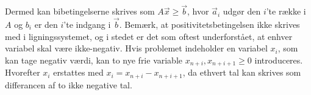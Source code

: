 
Dermed kan bibetingelserne skrives som $A\vec{x}\geq \vec{b}$, hvor $\vec{a}_i$ udgør den $i$'te række i $A$ og $b_i$ er den $i$'te indgang i $\vec{b}$.
Bemærk, at positivitetsbetingelsen ikke skrives med i ligningssystemet, og i stedet er det som oftest underforstået, at enhver variabel skal være ikke-negativ.
Hvis problemet indeholder en variabel $x_i$, som kan tage negativ værdi, kan to nye frie variable $x_{n+i}, x_{n+i+1} \geq 0$ introduceres.
Hvorefter $x_i$ erstattes med $x_i = x_{n+i}-x_{n+i+1}$, da ethvert tal kan skrives som differancen af to ikke negative tal. 




\begin{comment}
Derved bliver betingelserne for henholdsvis et maksimeringsproblem og et minimeringsproblem omskrevet til:
\begin{align*}
	A' &=\rvect{A & I_m}\\
	A' &=\rvect{A & -I_m}
\end{align*}


Man må vel ikke bare sige at $x_1 \geq 0$, men man skal sige at $x_1 = x_3 - x_4$, hvor $x_3, x_4 \geq 0$.
\end{comment}